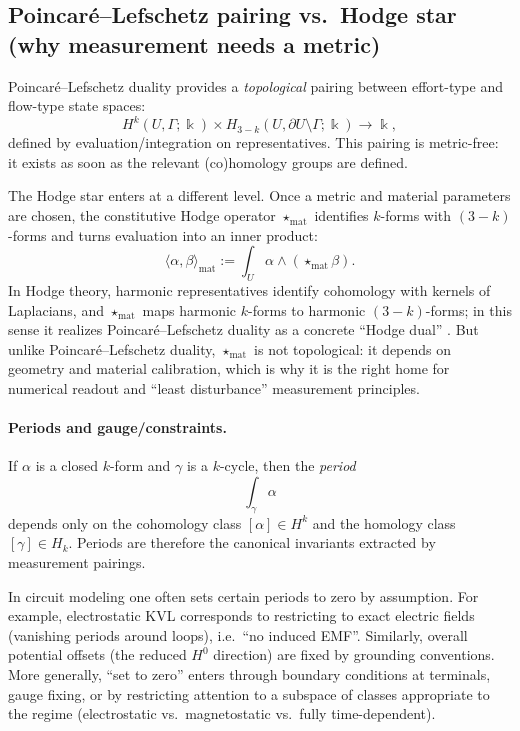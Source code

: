 \documentclass[11pt]{article}
\begin{document}
\subsection{Poincar\'e--Lefschetz pairing vs.\ Hodge star (why measurement needs a metric)}
Poincar\'e--Lefschetz duality provides a \emph{topological} pairing between effort-type and flow-type state spaces:
\[
H^k(U,\Gamma;\Bbbk)\times H_{3-k}(U,\partial U\setminus \Gamma;\Bbbk)\to \Bbbk,
\]
defined by evaluation/integration on representatives.
This pairing is metric-free: it exists as soon as the relevant (co)homology groups are defined.

The Hodge star enters at a different level.
Once a metric and material parameters are chosen, the constitutive Hodge operator $\star_{\mathrm{mat}}$ identifies $k$-forms with $(3-k)$-forms and turns evaluation into an inner product:
\[
\langle \alpha,\beta\rangle_{\mathrm{mat}}:=\int_U \alpha\wedge(\star_{\mathrm{mat}}\beta).
\]
In Hodge theory, harmonic representatives identify cohomology with kernels of Laplacians, and $\star_{\mathrm{mat}}$ maps harmonic $k$-forms to harmonic $(3-k)$-forms; in this sense it realizes Poincar\'e--Lefschetz duality as a concrete ``Hodge dual'' \cite{bott_tu_1982,arnold_falk_winther_2010_feec}.
But unlike Poincar\'e--Lefschetz duality, $\star_{\mathrm{mat}}$ is not topological: it depends on geometry and material calibration, which is why it is the right home for numerical readout and ``least disturbance'' measurement principles.

\paragraph{Periods and gauge/constraints.}
If $\alpha$ is a closed $k$-form and $\gamma$ is a $k$-cycle, then the \emph{period}
\[
\int_\gamma \alpha
\]
depends only on the cohomology class $[\alpha]\in H^k$ and the homology class $[\gamma]\in H_k$.
Periods are therefore the canonical invariants extracted by measurement pairings.

In circuit modeling one often sets certain periods to zero by assumption.
For example, electrostatic KVL corresponds to restricting to exact electric fields (vanishing periods around loops), i.e.\ ``no induced EMF''.
Similarly, overall potential offsets (the reduced $H^0$ direction) are fixed by grounding conventions.
More generally, ``set to zero'' enters through boundary conditions at terminals, gauge fixing, or by restricting attention to a subspace of classes appropriate to the regime (electrostatic vs.\ magnetostatic vs.\ fully time-dependent).
\end{document}
